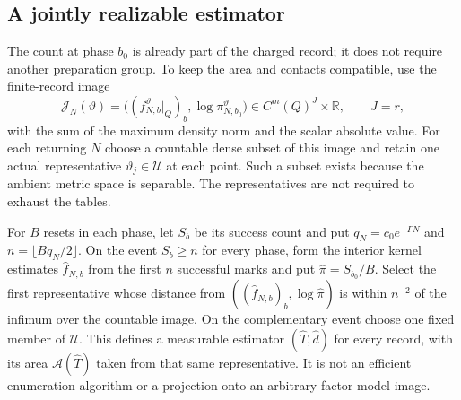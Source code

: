 \subsection{A jointly realizable estimator}

The count at phase $b_0$ is already part of the charged record; it does
not require another preparation group.  To keep the area and contacts
compatible, use the finite-record image
\begin{equation}\label{eq:v73-record-image}
 \mathcal J_N(\vartheta)=
   \bigl((f^\vartheta_{N,b}|_Q)_b,\log\pi^\vartheta_{N,b_0}\bigr)
 \in C^m(Q)^J\times\mathbb R,\qquad J=r,
\end{equation}
with the sum of the maximum density norm and the scalar absolute value.
For each returning $N$ choose a countable dense subset of this image
and retain one actual representative $\vartheta_j\in\mathscr U$ at
each point.  Such a subset exists because the ambient metric space is
separable.  The representatives are not required to exhaust the tables.

For $B$ resets in each phase, let $S_b$ be its success count and put
$q_N=c_0e^{-\Gamma N}$ and $n=\lfloor Bq_N/2\rfloor$.
On the event $S_b\ge n$ for every phase, form the interior kernel
estimates $\widehat f_{N,b}$ from the first $n$ successful marks and
put $\widehat\pi=S_{b_0}/B$.  Select the first representative whose
distance from $((\widehat f_{N,b})_b,\log\widehat\pi)$ is within
$n^{-2}$ of the infimum over the countable image.  On the complementary
event choose one fixed member of $\mathscr U$.  This defines a measurable
estimator $(\widehat T,\widehat d)$ for every record, with its area
$\mathcal A(\widehat T)$ taken from that same representative.
It is not an efficient enumeration algorithm or a projection onto an
arbitrary factor-model image.

